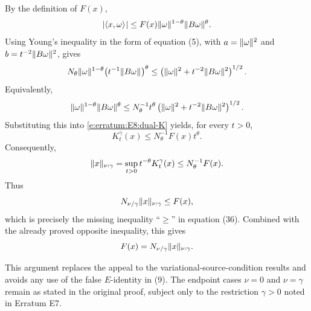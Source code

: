 By the definition of $F(x)$,
\[
        |\langle x,\omega \rangle_{  }|
        \leq
        F(x)\| \omega \|_{  }^{1-\theta}\| B\omega \|_{  }^\theta .
\]
Using Young's inequality in the form of equation (5), with
$a=\| \omega \|_{  }^2$ and $b=t^{-2}\| B\omega \|_{  }^2$, gives
\[
        N_\theta
        \| \omega \|_{  }^{1-\theta}
        \bigl(t^{-1}\| B\omega \|_{  }\bigr)^\theta
        \leq
        \left(\| \omega \|_{  }^2+t^{-2}\| B\omega \|_{  }^2\right)^{1/2}.
\]
Equivalently,
\[
        \| \omega \|_{  }^{1-\theta}\| B\omega \|_{  }^\theta
        \leq
        N_\theta^{-1} t^\theta
        \left(\| \omega \|_{  }^2+t^{-2}\| B\omega \|_{  }^2\right)^{1/2}.
\]
Substituting this into \eqref{e:erratum:E8:dual-K} yields, for every
$t>0$,
\[
        K_t^\gamma(x)
        \leq
        N_\theta^{-1} F(x) t^\theta .
\]
Consequently,
\[
        \| x \|_{ \nu:\gamma }
        =
        \sup_{t>0}t^{-\theta}K_t^\gamma(x)
        \leq
        N_\theta^{-1}F(x).
\]
Thus
\[
        N_{\nu/\gamma}\| x \|_{ \nu:\gamma }
        \leq
        F(x),
\]
which is precisely the missing inequality ``$\geq$'' in equation (36).
Combined with the already proved opposite inequality, this gives
\[
        F(x)=N_{\nu/\gamma}\| x \|_{ \nu:\gamma }.
\]

This argument replaces the appeal to the variational-source-condition results
and avoids any use of the false $E$-identity in (9).  The endpoint
cases $\nu=0$ and $\nu=\gamma$ remain as stated in the original proof, subject
only to the restriction $\gamma>0$ noted in Erratum E7.
